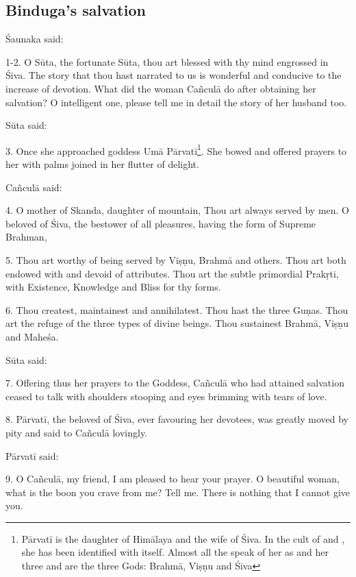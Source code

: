 {}
\subsection*{Binduga’s salvation}

Śaunaka said:

1-2. O Sūta, the fortunate Sūta, thou art blessed with thy mind engrossed in
Śiva. The story that thou hast narrated to us is wonderful and conducive to the
increase of devotion. What did the woman Cañculā do after obtaining her
salvation? O intelligent one, please tell me in detail the story of her husband
too.

Sūta said:

3. Once she approached goddess Umā Pārvatī\footnote{Pārvatī is the daughter of
Himālaya and the wife of Śiva. In the cult of  and , she
has been identified with  itself. Almost all the  speak
of her as  and her three  and  are
the three Gods: Brahmā, Viṣṇu and Śiva}. She bowed and offered prayers to her
with palms joined in her flutter of delight.

Cañculā said:

4. O mother of Skanda, daughter of mountain, Thou art always served by men. O
beloved of Śiva, the bestower of all pleasures, having the form of Supreme
Brahman,

5. Thou art worthy of being served by Viṣṇu, Brahmā and others. Thou art both
endowed with and devoid of attributes. Thou art the subtle primordial Prakṛti,
with Existence, Knowledge and Bliss for thy forms.

6. Thou createst, maintainest and annihilatest. Thou hast the three Guṇas. Thou
art the refuge of the three types of divine beings. Thou sustainest Brahmā,
Viṣṇu and Maheśa.

Sūta said:

7. Offering thus her prayers to the Goddess, Cañculā who had attained salvation
ceased to talk with shoulders stooping and eyes brimming with tears of love.

8. Pārvatī, the beloved of Śiva, ever favouring her devotees, was greatly moved
by pity and said to Cañculā lovingly.

Pārvatī said:

9. O Cañculā, my friend, I am pleased to hear your prayer. O beautiful woman,
what is the boon you crave from me? Tell me. There is nothing that I cannot give
you.


